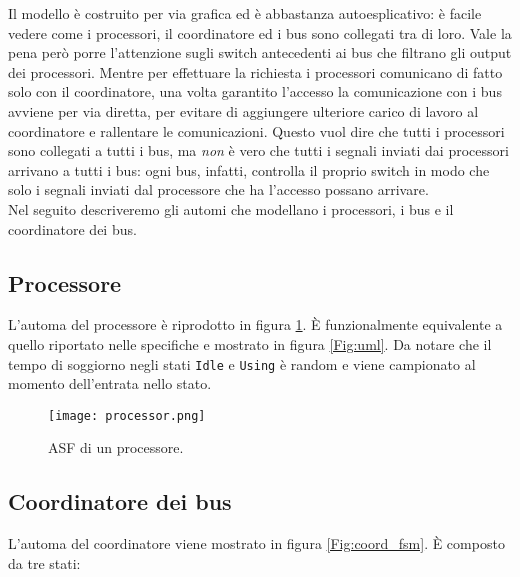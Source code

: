 \noindent
Il modello è costruito per via grafica ed è abbastanza autoesplicativo: è facile vedere come i processori, il coordinatore ed i bus sono collegati tra di loro. Vale la pena però porre l'attenzione sugli switch antecedenti ai bus che filtrano gli output dei processori. Mentre per effettuare la richiesta i processori comunicano di fatto solo con il coordinatore, una volta garantito l'accesso la comunicazione con i bus avviene per via diretta, per evitare di aggiungere ulteriore carico di lavoro al coordinatore e rallentare le comunicazioni. Questo vuol dire che tutti i processori sono collegati a tutti i bus, ma \textit{non} è vero che tutti i segnali inviati dai processori arrivano a tutti i bus: ogni bus, infatti, controlla il proprio switch in modo che solo i segnali inviati dal processore che ha l'accesso possano arrivare.\\

Nel seguito descriveremo gli automi che modellano i processori, i bus e il coordinatore dei bus.

\subsection{Processore} 
L'automa del processore è riprodotto in figura \ref{Fig:proc_fsm}. È funzionalmente equivalente a quello riportato nelle specifiche e mostrato in figura \ref{Fig:uml}. Da notare che il tempo di soggiorno negli stati \texttt{Idle} e \texttt{Using} è random e viene campionato al momento dell'entrata nello stato.

\begin{figure}
\vspace{-1cm}
\centerline{\texttt{[image: processor.png]}}
\caption{ASF di un processore.}
\label{Fig:proc_fsm}
\end{figure}

\pagebreak

\subsection{Coordinatore dei bus} 
L'automa del coordinatore viene mostrato in figura \ref{Fig:coord_fsm}. È composto da tre stati:


